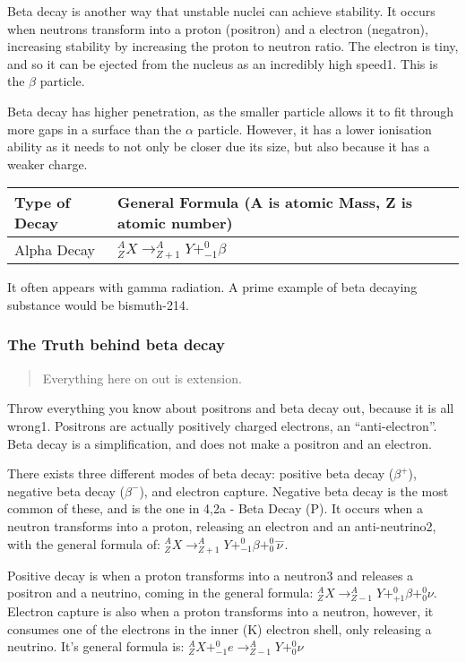 \documentclass[
]{article}
\begin{document}
Beta decay is another way that unstable nuclei can achieve stability. It
occurs when neutrons transform into a proton (positron) and a electron
(negatron), increasing stability by increasing the proton to neutron
ratio. The electron is tiny, and so it can be ejected from the nucleus
as an incredibly high speed1. This is the {\(\beta\)} particle.

Beta decay has higher penetration, as the smaller particle allows it to
fit through more gaps in a surface than the {\(\alpha\)} particle.
However, it has a lower ionisation ability as it needs to not only be
closer due its size, but also because it has a weaker charge.

\begin{longtable}[]{@{}ll@{}}
\toprule()
Type of Decay & General Formula (A is atomic Mass, Z is atomic
number) \\
\midrule()
\endhead
Alpha Decay &
{\(_{Z}^{A}X \rightarrow_{Z + 1}^{A}Y +_{- 1}^{0}\beta\)} \\
\bottomrule()
\end{longtable}

It often appears with gamma radiation. A prime example of beta decaying
substance would be bismuth-214.

\hypertarget{the-truth-behind-beta-decay}{%
\subsubsection{The Truth behind beta
decay}\label{the-truth-behind-beta-decay}}

\begin{quote}
Everything here on out is extension.
\end{quote}

Throw everything you know about positrons and beta decay out, because it
is all wrong1. Positrons are actually positively charged electrons, an
``anti-electron''. Beta decay is a simplification, and does not make a
positron and an electron.

There exists three different modes of beta decay: positive beta decay
({\(\beta^{+}\)}), negative beta decay ({\(\beta^{-}\)}), and electron
capture. Negative beta decay is the most common of these, and is the one
in 4,2a - Beta Decay (P). It occurs when a neutron transforms into a
proton, releasing an electron and an anti-neutrino2, with the general
formula of:
{\(_{Z}^{A}X \rightarrow_{Z + 1}^{A}Y +_{- 1}^{0}\beta +_{0}^{0}\overset{―}{\nu}\)}.

Positive decay is when a proton transforms into a neutron3 and releases
a positron and a neutrino, coming in the general formula:
{\(_{Z}^{A}X \rightarrow_{Z - 1}^{A}Y +_{+ 1}^{0}\beta +_{0}^{0}\nu\)}.
Electron capture is also when a proton transforms into a neutron,
however, it consumes one of the electrons in the inner (K) electron
shell, only releasing a neutrino. It's general formula is:
{\(_{Z}^{A}X +_{- 1}^{0}e \rightarrow_{Z - 1}^{A}Y +_{0}^{0}\nu\)}
\end{document}
